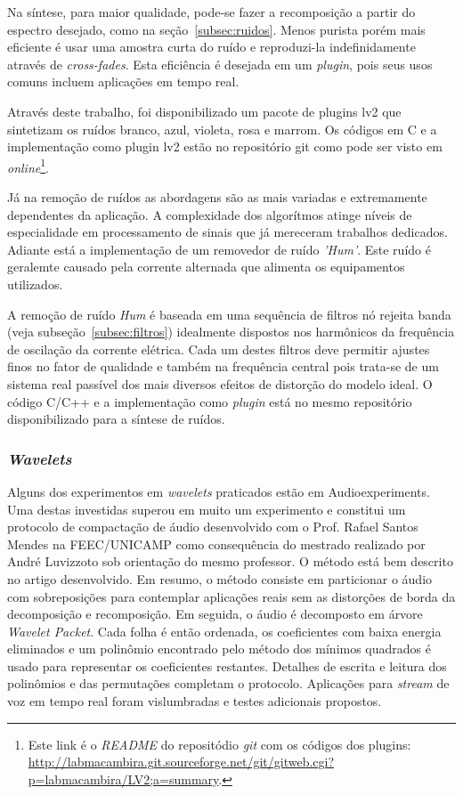 Na síntese, para maior qualidade, 
pode-se fazer a recomposição a partir do espectro desejado, como na seção~\ref{subsec:ruidos}.
Menos purista porém mais eficiente é
usar uma amostra curta do ruído e reproduzi-la indefinidamente
através de \emph{cross-fades}. Esta eficiência é desejada em um \emph{plugin},
pois seus usos comuns incluem aplicações em tempo real.

Através deste trabalho, foi disponibilizado um pacote de plugins lv2
que sintetizam os ruídos branco, azul, violeta, rosa e marrom. Os
  códigos em C e a implementação como plugin lv2 estão no
  repositório git como pode ser visto em \emph{online}\footnote{Este link é o \emph{README} do repositódio \emph{git} com os códigos dos
      plugins:
  \url{http://labmacambira.git.sourceforge.net/git/gitweb.cgi?p=labmacambira/LV2;a=summary}.}.

Já na remoção de ruídos as abordagens são as mais variadas e
extremamente dependentes da aplicação. A complexidade dos algorítmos
atinge níveis de especialidade em processamento de sinais que já
mereceram trabalhos dedicados. Adiante está a implementação de um
removedor de ruído \emph{'Hum'}. Este ruído é
geralemte causado pela corrente alternada que
alimenta os equipamentos utilizados.

A remoção de ruído \emph{Hum} é baseada em uma sequência de filtros nó rejeita
banda (veja subseção~\ref{subsec:filtros})
idealmente dispostos nos harmônicos da frequência de
oscilação da corrente elétrica. Cada um destes filtros deve permitir
ajustes finos no fator de qualidade e também na frequência central
pois trata-se de um sistema real passível dos mais diversos efeitos de
distorção do modelo ideal. O código C/C++ e a
implementação como \emph{plugin} está no mesmo repositório disponibilizado
para a síntese de ruídos.


\subsubsection{\emph{Wavelets}}
Alguns dos experimentos em \emph{wavelets} praticados estão em
Audioexperiments.\cite{Audioexperiments} Uma destas investidas
superou em muito um experimento e constitui um protocolo de compactação de áudio desenvolvido com o Prof. Rafael Santos Mendes na FEEC/UNICAMP como consequência do mestrado realizado por André Luvizzoto sob orientação do mesmo professor.
O método está bem descrito no artigo desenvolvido. Em resumo, o método consiste em particionar o áudio com sobreposições para contemplar aplicações reais sem as distorções de borda da decomposição e recomposição. Em seguida, o áudio é decomposto em árvore \emph{Wavelet Packet}. Cada folha é então ordenada, os coeficientes com baixa energia eliminados e um polinômio encontrado pelo método dos mínimos quadrados é usado para representar os coeficientes restantes. Detalhes de escrita e leitura dos polinômios e das permutações completam o protocolo. Aplicações para \emph{stream} de voz em tempo real foram vislumbradas e testes adicionais propostos.\cite{FabbriWavelets}

